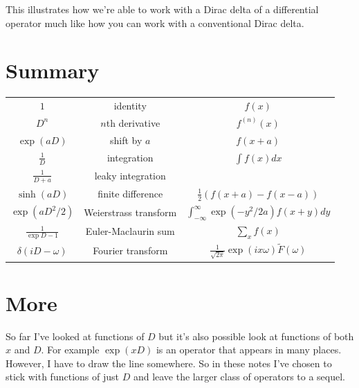 \documentclass[a4paper]{article}
\theoremstyle{definition}
\begin{document}
This illustrates how we're able to work with a Dirac delta of a differential operator much like how you can work with a conventional Dirac delta.


%

\section{Summary}
\begin{center}
\tabulinesep=1.2mm
\begin{tabu}{|c|c|c|}
\hline
$1$ & identity & $f(x)$ \\
$D^n$ & $n$th derivative & $f^{(n)}(x)$ \\
$\exp(aD)$ & shift by $a$ & $f(x+a)$ \\
$\frac{1}{D}$ & integration & $\int f(x)dx$ \\
$\frac{1}{D+a}$ & leaky integration & \\
$\sinh(aD)$ & finite difference & $\frac{1}{2}(f(x+a)-f(x-a))$ \\
$\exp(aD^2/2)$ & Weierstrass transform & $\int_{-\infty}^\infty \exp(-y^2/2a) f(x+y)dy$ \\
$\frac{1}{\exp D-1}$ & Euler-Maclaurin sum & $\sum_x f(x)$ \\
$\delta(iD-\omega)$ & Fourier transform & $\frac{1}{\sqrt{2\pi}}\exp(ix\omega)\tilde{F}(\omega)$ \\
\hline
\end{tabu}
\end{center}

\section{More}
So far I've looked at functions of $D$ but it's also possible look at functions of both $x$ and $D$.
For example $\exp(xD)$ is an operator that appears in many places.
However, I have to draw the line somewhere.
So in these notes I've chosen to stick with functions of just $D$ and leave the larger class of operators to a sequel.
\end{document}
